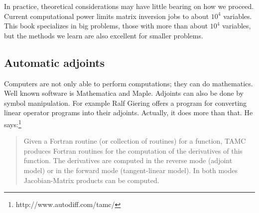 \par
In practice, theoretical considerations may have little
bearing on how we proceed.
Current computational power limits matrix inversion
jobs to about $10^4$ variables.
This book specializes in big problems,
those with more than about $10^4$ variables,
but the methods we learn are also excellent for smaller problems.

\subsection{Automatic adjoints}
Computers are not only able to perform computations; they can do
mathematics.  Well known software is Mathematica and Maple.  Adjoints
can also be done by symbol manipulation.  For example
Ralf Giering
offers a program for converting linear operator programs into their
adjoints.
Actually, it does more than that.
He says:\footnote{ http://www.autodiff.com/tamc/ }
\begin{quote}
Given a Fortran routine (or collection of routines) for a function,
TAMC produces Fortran routines for the computation
of the derivatives of this function.
The derivatives are computed in the reverse mode (adjoint model)
or in the forward mode (tangent-linear model).
In both modes Jacobian-Matrix products can be computed.
\end{quote}


